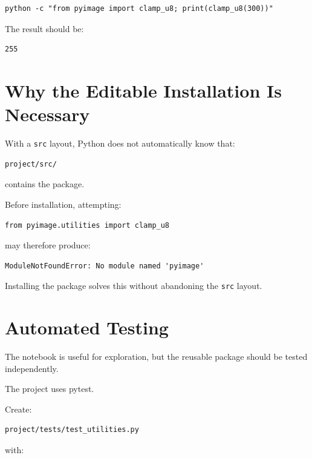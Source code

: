 \begin{verbatim}
python -c "from pyimage import clamp_u8; print(clamp_u8(300))"
\end{verbatim}

The result should be:

\begin{verbatim}
255
\end{verbatim}


\section{Why the Editable Installation Is Necessary}
\label{sec:why-editable}

With a \texttt{src} layout, Python does not automatically know that:

\begin{verbatim}
project/src/
\end{verbatim}

contains the package.

Before installation, attempting:

\begin{verbatim}
from pyimage.utilities import clamp_u8
\end{verbatim}

may therefore produce:

\begin{verbatim}
ModuleNotFoundError: No module named 'pyimage'
\end{verbatim}

Installing the package solves this without abandoning the
\texttt{src} layout.


\section{Automated Testing}
\label{sec:first-pytest}

The notebook is useful for exploration, but the reusable package
should be tested independently.

The project uses pytest.

Create:

\begin{verbatim}
project/tests/test_utilities.py
\end{verbatim}

with:


